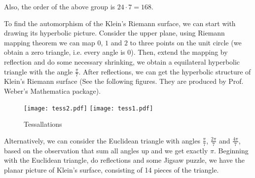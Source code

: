 Also, the order of the above group is $24\cdot 7=168$. 
\\ 
\par


To find the automorphism of the Klein's Riemann surface, we can start with drawing its hyperbolic picture. Consider the upper plane, using Riemann mapping theorem we can map $0$, $1$ and $2$ to three points on the unit circle (we obtain a zero triangle, i.e. every angle is $0$). Then, extend the mapping by reflection and do some necessary shrinking, we obtain a equilateral hyperbolic triangle with the angle $\frac{\pi}{7}$. After reflections, we can get the hyperbolic structure of Klein's Riemann surface (See the following figures. They are produced by Prof. Weber's Mathematica package).
\newpage
\begin{figure}[h!]
\centering
\texttt{[image: tess2.pdf]}
\texttt{[image: tess1.pdf]}
\caption{Tessallations}
\end{figure}

\par



Alternatively, we can consider the Euclidean triangle with angles $\frac{\pi}{7}$, $\frac{2\pi}{7}$ and $\frac{4\pi}{7}$, based on the observation that sum all angles up and we get exactly $\pi$. Beginning with the Euclidean triangle, do reflections and some Jigsaw puzzle, we have the planar picture of Klein's surface, consisting of 14 pieces of the triangle.  


